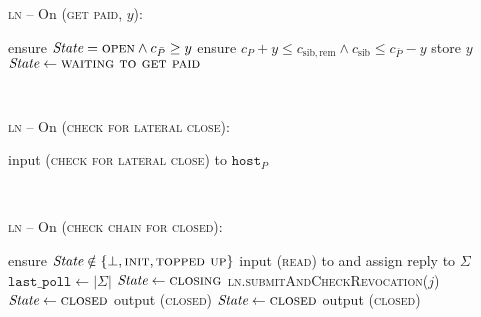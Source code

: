 \begin{center}
  \begin{processbox}{\textsc{ln} -- On (\textsc{get paid}, $y$):}
    \begin{algorithmic}[1]
      \State ensure $\itistate = \textsc{open} \wedge c_{\bar{P}} \geq y$
       
        \State ensure $c_P + y \leq c_{\mathrm{sib}, \mathrm{rem}} \wedge
        c_{\mathrm{sib}} \leq c_{\bar{P}} - y$ 
      \EndIf
      \State store $y$
      \State $\itistate \gets \textsc{waiting to get paid}$
      \label{code:ln:get-paid:state}
    \end{algorithmic}
  \end{processbox}
  \label{code:ln:get-paid}
\end{center} \ \\

\begin{center}
  \begin{processbox}{\textsc{ln} -- On (\textsc{check for lateral close}):}
    \begin{algorithmic}[1]
        \State input (\textsc{check for lateral close}) to
        $\texttt{host}_P$
      \EndIf
    \end{algorithmic}
  \end{processbox}
  \label{code:ln:poll-virtual}
\end{center} \ \\

\begin{center}
  \begin{processbox}{\textsc{ln} -- On (\textsc{check chain for closed}):}
    \begin{algorithmic}[1]
      \State ensure $\itistate \notin \{\bot, \textsc{init},
      \textsc{topped up}\}$ 
      \State {}
      \State input (\textsc{read}) to \ledger and assign reply to $\Sigma$
      \State $\texttt{last\_poll} \gets |\Sigma|$
        \State $\itistate \gets \textsc{closing}$
        \State \textsc{ln}.\textsc{submitAndCheckRevocation}($j$)
        \State $\itistate \gets \textsc{closed}$
        \label{code:ln:poll:state-closed-punished}
        \State output (\textsc{closed})
        \State $\itistate \gets \textsc{closed}$
        \label{code:ln:poll:state-closed-honestly}
        \State output (\textsc{closed})
      \EndIf
    \end{algorithmic}
  \end{processbox}
  \label{code:ln:poll}
\end{center} \ \\


